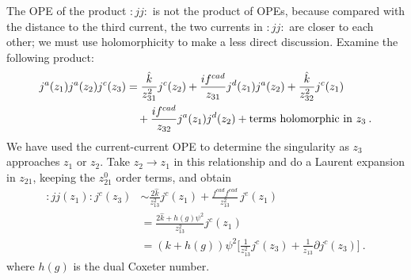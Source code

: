 The OPE of the product $:jj: $ is not the product of OPEs, because compared with the distance to the third current, the two currents in $:jj: $ are closer to each other; we must use holomorphicity to make a less direct discussion. Examine the following product:
\begin{align}
	j^{a}(z_{1})j^{a}(z_{2})j^{c}(z_{3})&=\frac{\hat{k}}{z_{31}^{2}}j^{c}(z_{2})+\frac{i f^{cad}}{z_{31}}j^{d}(z_{1})j^{a}(z_{2})+\frac{\hat{k}}{z_{32}^{2}}j^{c}(z_{1}) \nonumber \\
	&\quad +\frac{i f^{cad}}{z_{32}}j^{a}(z_{1})j^{d}(z_{2})+ \text{terms holomorphic in } z_{3} \:. \label{11.5.19}
\end{align}
We have used the current-current OPE to determine the singularity as $z_{3}$ approaches $z_{1}$ or $z_{2}$. Take $z_{2}\to z_{1}$ in this relationship and do a Laurent expansion in $z_{21}$, keeping the $z_{21}^{0}$ order terms, and obtain
\begin{align}
	:jj(z_{1}):j^{c}(z_{3}) &\sim \frac{2\hat{k}}{z_{13}^{2}}j^{c}(z_{1})+\frac{f^{cad}f^{ead}}{z_{13}^{2}}\,j^{e}(z_{1}) \nonumber\\
	&=\frac{2\hat{k}+h(g)\psi^{2}}{z_{13}^{2}}j^{c}(z_{1}) \nonumber \\
	&=(k+h(g))\psi^{2}\biggl[\frac{1}{z_{13}^{2}}j^{c}(z_{3})+\frac{1}{z_{13}}\partial j^{c}(z_{3})\biggr] \:. \label{11.5.20}
\end{align}
where $h(g)$ is the dual Coxeter number.
